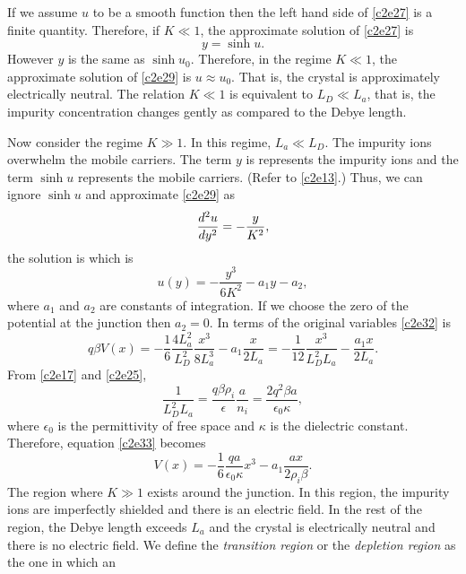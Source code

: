 If we assume $u$ to be a smooth function then the left hand side of 
\eqref{c2e27} is a finite quantity. Therefore, if $K \ll 1$, the approximate
solution of \eqref{c2e27} is
\begin{equation}\label{c2e30}
y = \sinh u.
\end{equation}
However $y$ is the same as $\sinh u_0$. Therefore, in the regime $K \ll 1$, the
approximate solution of \eqref{c2e29} is $u \approx u_0$. That is, the crystal 
is approximately electrically neutral. The relation $K \ll 1$ is equivalent to
$L_D \ll L_a$, that is, the impurity concentration changes gently as compared to
the Debye length. 

Now consider the regime $K \gg 1$. In this regime, $L_a \ll L_D$. The impurity
ions overwhelm the mobile carriers. The term $y$ is represents the impurity 
ions and the term $\sinh u$ represents the mobile carriers. (Refer to 
\eqref{c2e13}.) Thus, we can ignore $\sinh u$ and approximate \eqref{c2e29}
as
\begin{equation}\label{c2e31}
\frac{d^2{u}}{d{y}^2} = - \frac{y}{K^2},
\end{equation}
the solution is which is
\begin{equation}\label{c2e32}
u(y) = -\frac{y^3}{6K^2} - a_1 y - a_2,
\end{equation}
where $a_1$ and $a_2$ are constants of integration. If we choose the zero of
the potential at the junction then $a_2 = 0$. In terms of the original 
variables \eqref{c2e32} is
\begin{equation}\label{c2e33}
q\beta V(x) = -\frac{1}{6}\frac{4L_a^2}{L_D^2}\frac{x^3}{8L_a^3} - 
a_1\frac{x}{2L_a} = -\frac{1}{12}\frac{x^3}{L_D^2L_a} - \frac{a_1x}{2L_a}.
\end{equation}
From \eqref{c2e17} and \eqref{c2e25},
\[
\frac{1}{L_D^2L_a} = \frac{q\beta \rho_i}{\epsilon}\frac{a}{n_i} = 
\frac{2q^2\beta a}{\epsilon_0\kappa},
\]
where $\epsilon_0$ is the permittivity of free space and $\kappa$ is the 
dielectric constant. Therefore, equation \eqref{c2e33} becomes
\begin{equation}\label{c2e34}
V(x) = -\frac{1}{6}\frac{qa}{\epsilon_0\kappa}x^3 - a_1 \frac{ax}{2\rho_i\beta}.
\end{equation}
The region where $K \gg 1$ exists around the junction. In this region, the 
impurity ions are imperfectly shielded and there is an electric field. In the 
rest of the region, the Debye length exceeds $L_a$ and the crystal is 
electrically neutral and there is no electric field. We define the 
\emph{transition region} or the \emph{depletion region} as the one in which an
